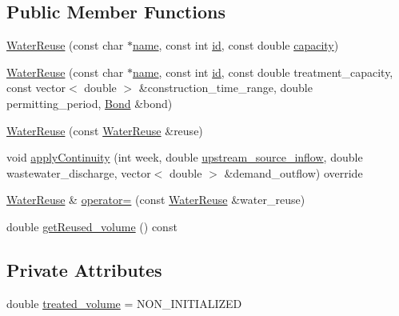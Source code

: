 \subsection*{Public Member Functions}
\begin{DoxyCompactItemize}
\item 
\mbox{\hyperlink{classWaterReuse_a0493da65856f50fad2bc2d2c087f378f_a0493da65856f50fad2bc2d2c087f378f}{Water\+Reuse}} (const char $\ast$\mbox{\hyperlink{classWaterSource_a846ea74c5b453d014f594d41fee8c765_a846ea74c5b453d014f594d41fee8c765}{name}}, const int \mbox{\hyperlink{classWaterSource_a6eafe5dfefd317877d1244e8a7c6e742_a6eafe5dfefd317877d1244e8a7c6e742}{id}}, const double \mbox{\hyperlink{classWaterSource_a2ec257b415b248214a8bce7fc5267723_a2ec257b415b248214a8bce7fc5267723}{capacity}})
\item 
\mbox{\hyperlink{classWaterReuse_a107ecd54d6fd705f0c31e57de21914e1_a107ecd54d6fd705f0c31e57de21914e1}{Water\+Reuse}} (const char $\ast$\mbox{\hyperlink{classWaterSource_a846ea74c5b453d014f594d41fee8c765_a846ea74c5b453d014f594d41fee8c765}{name}}, const int \mbox{\hyperlink{classWaterSource_a6eafe5dfefd317877d1244e8a7c6e742_a6eafe5dfefd317877d1244e8a7c6e742}{id}}, const double treatment\+\_\+capacity, const vector$<$ double $>$ \&construction\+\_\+time\+\_\+range, double permitting\+\_\+period, \mbox{\hyperlink{classBond}{Bond}} \&bond)
\item 
\mbox{\hyperlink{classWaterReuse_abe522bfe68c8b0bd05c4e608f3f6e6ba_abe522bfe68c8b0bd05c4e608f3f6e6ba}{Water\+Reuse}} (const \mbox{\hyperlink{classWaterReuse}{Water\+Reuse}} \&reuse)
\item 
void \mbox{\hyperlink{classWaterReuse_ab8ffb10c69790047a3a5dda66cfaf3ee_ab8ffb10c69790047a3a5dda66cfaf3ee}{apply\+Continuity}} (int week, double \mbox{\hyperlink{classWaterSource_a7a69b2e9b6030f1035e6cf44d2918ee5_a7a69b2e9b6030f1035e6cf44d2918ee5}{upstream\+\_\+source\+\_\+inflow}}, double wastewater\+\_\+discharge, vector$<$ double $>$ \&demand\+\_\+outflow) override
\item 
\mbox{\hyperlink{classWaterReuse}{Water\+Reuse}} \& \mbox{\hyperlink{classWaterReuse_a8bf201adfc25021511d8844cd056d5bf_a8bf201adfc25021511d8844cd056d5bf}{operator=}} (const \mbox{\hyperlink{classWaterReuse}{Water\+Reuse}} \&water\+\_\+reuse)
\item 
double \mbox{\hyperlink{classWaterReuse_a78c905f77ca46fbbb2251f9cfa9a04de_a78c905f77ca46fbbb2251f9cfa9a04de}{get\+Reused\+\_\+volume}} () const
\end{DoxyCompactItemize}
\subsection*{Private Attributes}
\begin{DoxyCompactItemize}
\item 
double \mbox{\hyperlink{classWaterReuse_a47ef62349f0092ccdda066905c89111a_a47ef62349f0092ccdda066905c89111a}{treated\+\_\+volume}} = N\+O\+N\+\_\+\+I\+N\+I\+T\+I\+A\+L\+I\+Z\+ED
\end{DoxyCompactItemize}
